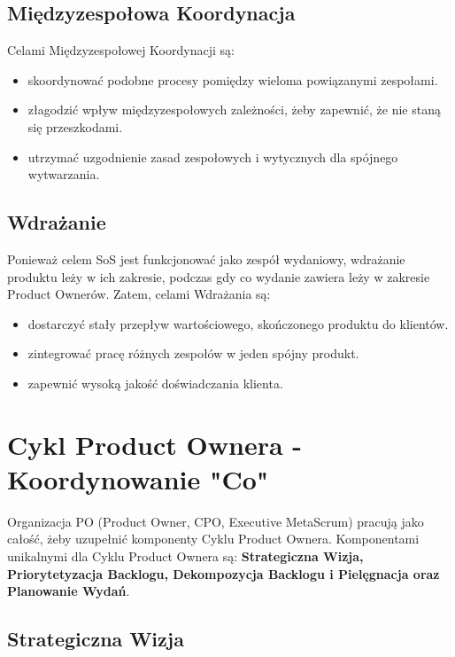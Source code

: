 \documentclass[12pt,a4paper,parskip=full]{scrartcl}
\begin{document}
\subsection{Międzyzespołowa Koordynacja}

Celami Międzyzespołowej Koordynacji są:

\begin{itemize}
	\item skoordynować podobne procesy pomiędzy wieloma powiązanymi zespołami.
	\item złagodzić wpływ międzyzespołowych zależności, żeby zapewnić, że nie staną się przeszkodami.
	\item utrzymać uzgodnienie zasad zespołowych i wytycznych dla spójnego wytwarzania.
\end{itemize}

\subsection{Wdrażanie}

Ponieważ celem SoS jest funkcjonować jako zespół wydaniowy, wdrażanie produktu leży w ich zakresie, podczas gdy co wydanie zawiera leży w zakresie Product Ownerów. Zatem, celami Wdrażania są:


\begin{itemize}
	\item dostarczyć stały przepływ wartościowego, skończonego produktu do klientów.
	\item zintegrować pracę różnych zespołów w jeden spójny produkt.
	\item zapewnić wysoką jakość doświadczania klienta.
\end{itemize}

\section{Cykl Product Ownera - Koordynowanie "Co"}

Organizacja PO (Product Owner, CPO, Executive MetaScrum) pracują jako całość, żeby uzupełnić komponenty Cyklu Product Ownera. Komponentami unikalnymi dla Cyklu Product Ownera są: \textbf{Strategiczna Wizja, Priorytetyzacja Backlogu, Dekompozycja Backlogu i Pielęgnacja oraz Planowanie Wydań}.

\subsection{Strategiczna Wizja}
\end{document}
